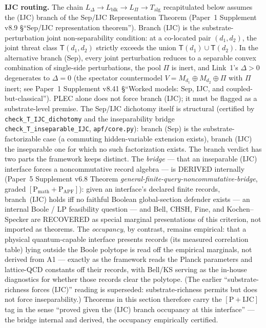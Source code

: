 \documentclass[11pt]{article}
\theoremstyle{definition}
\begin{document}
\smallskip\noindent\textbf{IJC routing.}\quad
The chain $L_\Delta \to L_{\mathrm{blk}} \to L_\Pi \to T_{\mathrm{alg}}$
recapitulated below assumes the (IJC) branch of the Sep/IJC
Representation Theorem (Paper~1 Supplement v8.9 \S``Sep/IJC
representation theorem'').
Branch (IJC) is the substrate-perturbation joint non-separability
condition: at a co-located pair $(d_1, d_2)$, the joint threat class
$\mathsf{T}(d_1, d_2)$ strictly exceeds the union
$\mathsf{T}(d_1) \cup \mathsf{T}(d_2)$.  In the alternative branch
(Sep), every joint perturbation reduces to a separable convex
combination of single-side perturbations, the pool $\Pi$ is inert,
and Link~1's $\Delta > 0$ degenerates to $\Delta = 0$ (the spectator
countermodel $V = M_{d_1} \oplus M_{d_2} \oplus \Pi$ with $\Pi$
inert; see Paper~1 Supplement v8.41 \S``Worked models: Sep, IJC,
and coupled-but-classical'').
PLEC alone does not force branch (IJC); it must be flagged as a
substrate-level premise.  The Sep/IJC dichotomy itself is structural
(certified by \texttt{check\_T\_IJC\_dichotomy} and the inseparability
bridge \texttt{check\_T\_inseparable\_IJC}, \texttt{apf/core.py}): branch
(Sep) is the substrate-factorizable case (a commuting hidden-variable
extension exists), branch (IJC) the inseparable one for which no such
factorization exists.  The branch verdict has two parts the framework keeps distinct.  The
\emph{bridge} --- that an inseparable (IJC) interface forces a
noncommutative record algebra --- is DERIVED internally (Paper~5
Supplement v6.8 Theorem \emph{general-finite-query-noncommutative-bridge},
graded $[\mathrm{P_{math}}{+}\mathrm{P_{APF}}]$): given an interface's
declared finite records, branch~(IJC) holds iff no faithful Boolean
global-section defender exists --- an internal Boole / LP feasibility
question --- and Bell, CHSH, Fine, and Kochen--Specker are RECOVERED as
special marginal presentations of this criterion, not imported as
theorems.  The \emph{occupancy}, by contrast, remains empirical: that a
physical quantum-capable interface presents records (its measured
correlation table) lying outside the Boole polytope is read off the
empirical marginals, not derived from A1 --- exactly as the framework
reads the Planck parameters and lattice-QCD constants off their records,
with Bell/KS serving as the in-house diagnostics for whether those records
clear the polytope.  (The earlier ``substrate-richness forces (IJC)''
reading is superseded: substrate-richness permits but does not force
inseparability.)  Theorems in this section therefore carry the
$[\mathrm{P}{+}\mathrm{IJC}]$ tag in the sense ``proved given the (IJC)
branch occupancy at this interface'' --- the bridge internal and derived,
the occupancy empirically certified.
\end{document}

